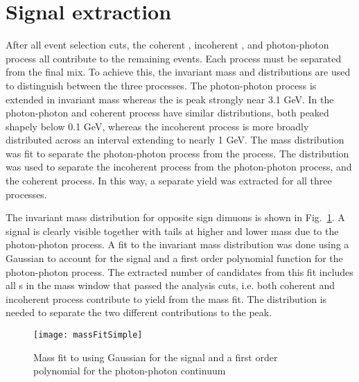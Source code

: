   \section{\label{sec:sigEx} Signal extraction}
    After all event selection cuts, the coherent \JPsi{}, incoherent \JPsi{},
      and photon-photon process all contribute to the remaining events.
    Each process must be separated from the final mix.
    To achieve this, the invariant mass and \pt{} distributions are used 
      to distinguish between the three processes. 
    The photon-photon process is extended in invariant mass whereas the 
      \JPsi{} is peak strongly near 3.1 GeV.
    In \pt{} the photon-photon and coherent process have similar 
      distributions, both peaked shapely below 0.1 GeV, whereas the incoherent 
      process is more broadly distributed across an interval extending to 
      nearly 1 GeV.
    The mass distribution was fit to separate the photon-photon process from
      the \JPsi{} process.
    The \pt{} distribution was used to separate the incoherent process from 
      the photon-photon process, and the coherent process. 
    In this way, a separate yield was extracted for all three processes. 
    
    The invariant mass distribution for opposite sign dimuons is shown in 
      Fig.~\ref{fig:massFit}. 
    A \JPsi{} signal is clearly visible together with tails at higher and
      lower mass due to the photon-photon process.
    A fit to the invariant mass distribution was done using a Gaussian
      to account for the \JPsi{} signal and a first order polynomial function 
      for the photon-photon process.
    The extracted number of \JPsi{} candidates from this fit includes all 
      \JPsi{}s in the mass window that passed the analysis cuts, i.e. both
      coherent and incoherent process contribute to yield from the mass
      fit.
    The \pt{} distribution is needed to separate the two different 
      contributions to the \JPsi{} peak. 

    \begin{figure}[!Hhtb]
      \centering
      \texttt{[image: massFitSimple]}
      \caption{Mass fit to \JPsi{} using Gaussian for the 
        signal and a first order polynomial for the photon-photon continuum}
      \label{fig:massFit}
    \end{figure}
  
